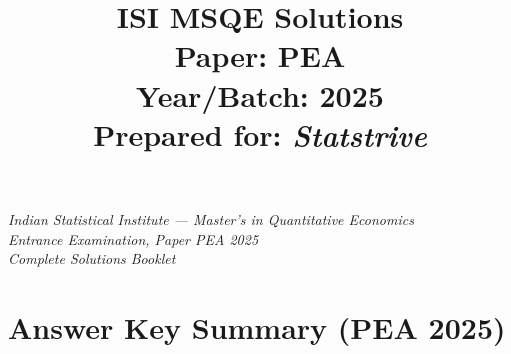 \documentclass[11pt]{article}
\title{\textbf{ISI MSQE Solutions}\\[4pt]
\large Paper: PEA \\
Year/Batch: 2025 \\[4pt]
Prepared for: \textit{Statstrive}}
\author{}
\date{}
\begin{document}
\maketitle
\thispagestyle{empty}

\vspace{1cm}
\begin{center}
\textit{Indian Statistical Institute --- Master's in Quantitative Economics}\\
\textit{Entrance Examination, Paper PEA 2025}\\
\textit{Complete Solutions Booklet}
\end{center}

\newpage
\tableofcontents
\newpage

\section*{Answer Key Summary (PEA 2025)}
\end{document}

